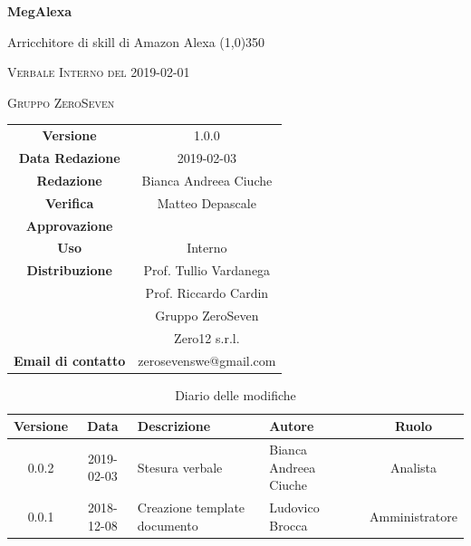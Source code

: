 \documentclass[a4paper,12pt]{article}
\author{Bianca Andreea Ciuche}
\date{2019-02-01}
\begin{document}
	\begin{titlepage}
		\centering
		{\huge\bfseries MegAlexa\par}
		Arricchitore di skill di Amazon Alexa
		\line(1,0){350} \\
		{\scshape\LARGE Verbale Interno del 2019-02-01 \par}
		\vspace{1cm}
		{\scshape Gruppo ZeroSeven \par}
		\logo
		\begin{tabular}{c|c}
			{\hfill \textbf{Versione}} 			& 1.0.0				\\
			{\hfill\textbf{Data Redazione}} 	& 2019-02-03		\\ 
			{\hfill\textbf{Redazione}} 			&  		Bianca Andreea Ciuche		\\ 
			{\hfill\textbf{Verifica}} 				&  	  	Matteo Depascale\\ 
			{\hfill\textbf{Approvazione}} 		&  		\\ 
			{\hfill\textbf{Uso}} 					& 	Interno	\\ 
			{\hfill\textbf{Distribuzione}} 			& 			Prof. Tullio Vardanega \\ & Prof. Riccardo Cardin \\ & Gruppo ZeroSeven \\ & Zero12 s.r.l.	\\ 
			{\hfill\textbf{Email di contatto}} & zerosevenswe@gmail.com \\
		\end{tabular}
	\end{titlepage}
	
	
	
	\label{LastFrontPage}
	
	
	\newpage
	\cleardoublepage
	\begin{table}[tbph]
		\centering
		\begin{tabularx}{\textwidth}{|c|c|X|X|c|}
			\hline
			\textbf{Versione} & \textbf{Data} & \textbf{Descrizione} & \textbf{Autore} & \textbf{Ruolo} \\
			\hline
			0.0.2 & 2019-02-03 & Stesura verbale &Bianca Andreea Ciuche  & Analista \\
			\hline
			0.0.1 & 2018-12-08 & Creazione template documento & Ludovico Brocca & Amministratore\\
			\hline
		\end{tabularx}
		\caption{Diario delle modifiche}
	\end{table}
	\cleardoublepage
	\pagestyle{mymain}
	
\end{document}
